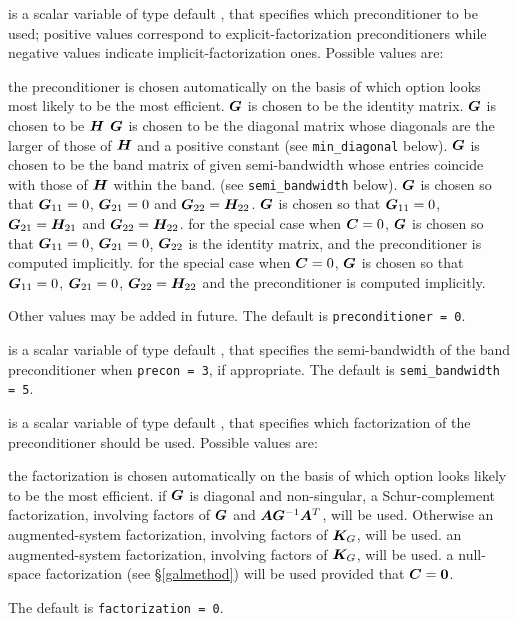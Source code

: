 \documentclass{galahad}
\begin{document}
\begin{description}
 is a scalar variable of type default \integer, 
that specifies which preconditioner to be used;
positive values correspond to explicit-factorization preconditioners 
while negative values indicate implicit-factorization ones. Possible values are:

\begin{description}
 the preconditioner is chosen automatically on the basis of which option 
        looks most likely to be the most efficient.
 ${\bm{G}}$ is chosen to be the identity matrix.
 ${\bm{G}}$ is chosen to be ${\bm{H}}$
 ${\bm{G}}$ is chosen to be the diagonal matrix whose diagonals
        are the larger of those of ${\bm{H}}$ and a positive constant
        (see {\tt min\_diagonal} below).
 ${\bm{G}}$ is chosen to be the band matrix  of given semi-bandwidth
        whose entries coincide with those of ${\bm{H}}$ within the band.
        (see {\tt semi\_bandwidth} below).
 ${\bm{G}}$ is chosen so that ${\bm{G}}_{11} = 0$, ${\bm{G}}_{21} = 0$
        and ${\bm{G}}_{22} = {\bm{H}}_{22}$.
 ${\bm{G}}$ is chosen so that ${\bm{G}}_{11} = 0$, ${\bm{G}}_{21} = {\bm{H}}_{21}$
        and ${\bm{G}}_{22} = {\bm{H}}_{22}$.
 for the special case when ${\bm{C}} = 0$,
        ${\bm{G}}$ is chosen so that ${\bm{G}}_{11} = 0$, ${\bm{G}}_{21} = 0$,
        ${\bm{G}}_{22}$ is the identity matrix, and the preconditioner is computed
        implicitly.
 for the special case when ${\bm{C}} = 0$, 
        ${\bm{G}}$ is chosen so that ${\bm{G}}_{11} = 0$, ${\bm{G}}_{21} = 0$,
        ${\bm{G}}_{22} = {\bm{H}}_{22}$ and the preconditioner is computed
        implicitly.
\end{description}
Other values may be added in future.
The default is {\tt preconditioner = 0}.

 is a scalar variable of type default \integer, that 
specifies the semi-bandwidth of the band preconditioner when {\tt precon = 3}, 
if appropriate.
The default is {\tt semi\_bandwidth = 5}.

 is a scalar variable of type default \integer, that
specifies which factorization of the preconditioner should be used.  
Possible values are:

\begin{description}
 the factorization is chosen automatically on the basis of which option 
        looks likely to be the most efficient.
 if ${\bm{G}}$ is diagonal and non-singular, a Schur-complement
        factorization, involving factors of ${\bm{G}}$ and ${\bm{A}} {\bm{G}}^{-1} {\bm{A}}^T$, 
        will be used. Otherwise an augmented-system factorization, involving 
        factors of ${\bm{K}}_G$, will be used.
 an augmented-system factorization, involving factors of ${\bm{K}}_G$,
        will be used.
 a null-space factorization (see \S\ref{galmethod}) will be used
provided that ${\bm{C}} = {\bm{0}}$.
\end{description}
The default is {\tt factorization = 0}.


\end{description}
\end{document}
